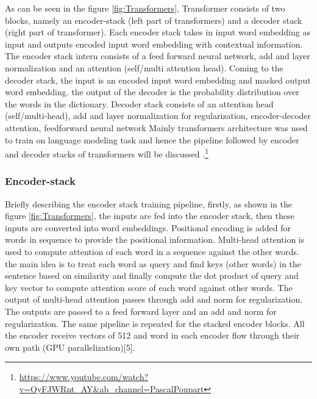 As can be seen in the figure \ref{fig:Transformers}, Transformer consists of two blocks, namely an encoder-stack (left part of transformers) and a decoder stack (right part of transformer). Each encoder stack takes in input word embedding as input and outputs encoded input word embedding with contextual information. The encoder stack intern consists of a feed forward neural network, add and layer normalization and an attention (self/multi attention head). Coming to the decoder stack, the input is an encoded input word embedding and masked output word embedding. the output of the decoder is the probability distribution over the words in the dictionary. Decoder stack consists of  an attention head (self/multi-head), add and layer normalization for regularization, encoder-decoder attention, feedforward neural network Mainly transformers architecture was used to train on language modeling task and hence the pipeline followed by encoder and decoder stacks of transformers will be discussed .\footnote{\url{https://www.youtube.com/watch?v=OyFJWRnt_AY&ab_channel=PascalPoupart}} \cite{vaswani2017attention}

\subsubsection{Encoder-stack}
Briefly describing the encoder stack training pipeline, firstly, as shown in the figure \ref{fig:Transformers}, the inputs are fed into the encoder stack, then these inputs are converted into word embeddings. Positional encoding is added for words in sequence to provide the positional information. Multi-head attention is used to compute attention of each word in a sequence against the other words. the main idea is to treat each word as query and find keys (other words) in the sentence based on similarity and finally compute the dot product of query and key vector to compute attention score of each word against other words. The output of multi-head attention passes through add and norm for regularization. The outputs are passed to a feed forward layer and an add and norm for regularization. The same pipeline is repeated for the stacked encoder blocks. All the encoder receive vectors of 512 and word in each encoder flow through their own path (GPU parallelization)[5]\cite{vaswani2017attention}.

